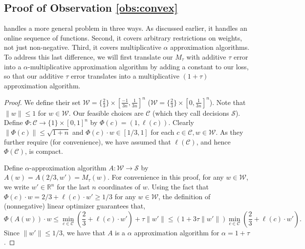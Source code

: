 \documentclass[final, 12pt]{colt2018} %
\def\reals{{\mathbb R}}
\def\calW{\mathcal{W}}
\def\calC{\mathcal{C}}
\def\calS{\mathcal{S}}
\def\norm#1{\mathopen\| #1 \mathclose\|}%
\begin{document}
\subsection{Proof of Observation \ref{obs:convex}}\label{sec:convex-proof}
\cite{KakadeKL09} handles a more general problem in three ways. As discussed earlier, it handles an online sequence of functions. Second, it covers arbitrary restrictions on weights, not just non-negative. Third, it covers multiplicative $\alpha$ approximation algorithms. To address this last difference, we will first translate our $M_\tau$ with additive $\tau$ error into a $\alpha$-multiplicative approximation algorithm by adding a constant to our loss, so that our additive $\tau$ error translates into a multiplicative $(1+\tau)$ approximation algorithm.
\begin{proof}
We define their set $\calW=\{\frac{2}{3}\}\times [\frac{-1}{3n},\frac{1}{3n}]^n$ ($\calW=\{\frac{2}{3}\}\times [0,\frac{1}{3n}]^n$). Note that $\norm{w}\leq 1$ for $w \in \calW$.
Our feasible choices are $\calC$ (which they call decisions $\calS$). Define $\Phi:\calC \rightarrow \{1\}\times [0,1]^n$ by $\Phi(c) = (1, \ell(c))$.
Clearly $\norm{\Phi(c)}\leq \sqrt{1+n}$ and  $\Phi(c) \cdot w \in [1/3,1]$ for each $c\in \calC,w\in \calW$. As they further require (for convenience), we have assumed that $\ell(\calC)$, and hence $\Phi(\calC)$, is compact. 

Define $\alpha$-approximation algorithm $A: \calW \rightarrow \calS$ by $A(w) = A(2/3, w') = M_\tau(w)$.
For convenience in this proof, for any $w \in \calW$, we write $w' \in \reals^n$ for the last $n$ coordinates of $w$. 
 Using the fact that $\Phi(c) \cdot w = 2/3 + \ell(c) \cdot w' \geq 1/3$ for any $w \in \calW$,
the definition of (nonnegative) linear optimizer guarantees that,
$$\Phi(A(w)) \cdot w \leq 
\min_{c \in \calC} \left(\frac{2}{3} + \ell(c) \cdot w'\right) + \tau\norm{w'}\leq (1+3\tau\norm{w'})\min_{c \in \calC} \left(\frac{2}{3} + \ell(c) \cdot w'\right).$$
Since $\norm{w'} \leq 1/3$, we have that $A$ is a $\alpha$ approximation algorithm for $\alpha = 1+\tau$. 


\end{proof}
\end{document}
